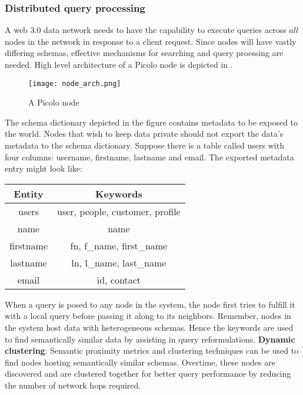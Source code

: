 \subsubsection{Distributed query processing} \label{sec:dynamic_cluster}
A web 3.0 data network needs to have the capability to execute queries across $all$ nodes in the network in response to a client request. Since nodes will have vastly differing schemas, effective mechanisms for searching and query proessing \cite{query_reformulation, query_processing1, query_processing2} are needed. High level architecture of a \textsf{Picolo} node is depicted in .
\begin{figure}[h!] \centering
	\texttt{[image: node\_arch.png]}
	\caption{A \textsf{Picolo} node}
	\label{fig:node_arch}
\end{figure}
The schema dictionary depicted in the figure contains metadata to be exposed to the world. Nodes that wish to keep data private should not export the data's metadata to the schema dictionary. Suppose there is a table called \textsf{users} with four columns: \textsf{username}, \textsf{firstname}, \textsf{lastname} and \textsf{email}. The exported metadata entry might look like:
\begin{center}
	\begin{tabular}{| c | c |} 
		\hline
		Entity & Keywords \\ [0.5ex] 
		\hline
		\textsf{users} & user, people, customer, profile\\ 
		\hline
		\textsf{name} & name \\
		\hline
		\textsf{firstname} & fn, {f\_name}, {first\_name} \\
		\hline
		\textsf{lastname} & ln, {l\_name}, {last\_name} \\
		\hline
		\textsf{email} & id, contact \\ [1ex] 
		\hline
	\end{tabular}
\end{center}
When a query is posed to any node in the system, the node first tries to fulfill it with a local query before passing it along to its neighbors. Remember, nodes in the system host data with heterogeneous schemas. Hence the keywords are used to find semantically similar data by assisting in query reformulations.
\newline\newline
\textbf{Dynamic clustering}:
Semantic proximity metrics \cite{PeerDB} and clustering techniques \cite{dynamic_clustering} can be used to find nodes hosting semantically similar schemas. Overtime, these nodes are discovered and are clustered together for better query performance by reducing the number of network hops required.


